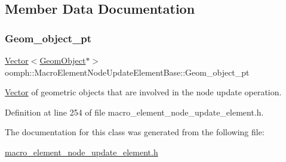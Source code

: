 \subsection{Member Data Documentation}
\mbox{\label{classoomph_1_1MacroElementNodeUpdateElementBase_a5781fd69b72b1c4c6618fe549b4ed81b}} 
\subsubsection{\texorpdfstring{Geom\+\_\+object\+\_\+pt}{Geom\_object\_pt}}
{\footnotesize\ttfamily \hyperlink{classoomph_1_1Vector}{Vector}$<$\hyperlink{classoomph_1_1GeomObject}{Geom\+Object}$\ast$$>$ oomph\+::\+Macro\+Element\+Node\+Update\+Element\+Base\+::\+Geom\+\_\+object\+\_\+pt\hspace{0.3cm}{\ttfamily [protected]}}



\hyperlink{classoomph_1_1Vector}{Vector} of geometric objects that are involved in the node update operation. 



Definition at line 254 of file macro\+\_\+element\+\_\+node\+\_\+update\+\_\+element.\+h.



The documentation for this class was generated from the following file\+:\begin{DoxyCompactItemize}
\item 
\hyperlink{macro__element__node__update__element_8h}{macro\+\_\+element\+\_\+node\+\_\+update\+\_\+element.\+h}\end{DoxyCompactItemize}

